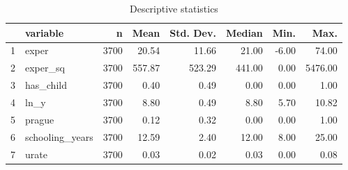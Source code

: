 \begin{table}[ht]
\centering
\caption{Descriptive statistics} 
\begin{tabular}{rlrrrrrr}
  \hline
 & variable & n & Mean & Std. Dev. & Median & Min. & Max. \\ 
  \hline
1 & exper & 3700 & 20.54 & 11.66 & 21.00 & -6.00 & 74.00 \\ 
  2 & exper\_sq & 3700 & 557.87 & 523.29 & 441.00 & 0.00 & 5476.00 \\ 
  3 & has\_child & 3700 & 0.40 & 0.49 & 0.00 & 0.00 & 1.00 \\ 
  4 & ln\_y & 3700 & 8.80 & 0.49 & 8.80 & 5.70 & 10.82 \\ 
  5 & prague & 3700 & 0.12 & 0.32 & 0.00 & 0.00 & 1.00 \\ 
  6 & schooling\_years & 3700 & 12.59 & 2.40 & 12.00 & 8.00 & 25.00 \\ 
  7 & urate & 3700 & 0.03 & 0.02 & 0.03 & 0.00 & 0.08 \\ 
   \hline
\end{tabular}
\end{table}
